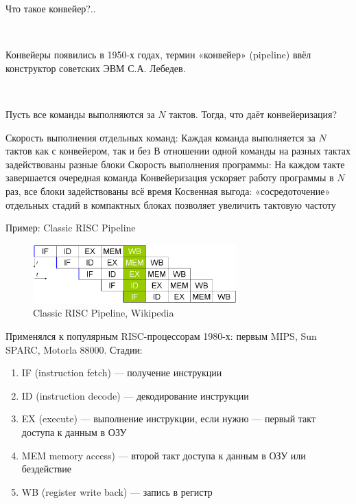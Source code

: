 \documentclass[xetex,aspectratio=43]{beamer}
\begin{document}
\begin{frame}{Что такое конвейер?..}

    ~

    Конвейеры появились в 1950-х годах, термин «конвейер» (pipeline) ввёл конструктор советских ЭВМ С.А. Лебедев.

    ~

    Пусть все команды выполняются за $N$ тактов. Тогда, что даёт конвейеризация?

    \begin{outline}[itemize]
        \1 Скорость выполнения отдельных команд:
            \2 Каждая команда выполняется за $N$ тактов как с конвейером, так и без
            \2 В отношении одной команды на разных тактах задействованы разные блоки
        \1 Скорость выполнения программы:
            \2 На каждом такте завершается очередная команда
            \2 Конвейеризация ускоряет работу программы в $N$ раз, все блоки задействованы всё время
            \pause
            \2 Косвенная выгода: «сосредоточение» отдельных стадий в компактных блоках позволяет увеличить тактовую частоту
    \end{outline}

\end{frame}


\begin{frame}{Пример: Classic RISC Pipeline}
    \begin{figure}
        \includegraphics[width=0.7\textwidth]{img/11.classic-RISC-pipeline.png}
        \caption{Classic RISC Pipeline, Wikipedia}
    \end{figure}
    Применялся к популярным RISC-процессорам 1980-х: первым MIPS, Sun SPARC, Motorla 88000.
    Стадии:
    \begin{enumerate}
        \tightlist
        \item IF (instruction fetch) — получение инструкции
        \item ID (instruction decode) — декодирование инструкции
        \item EX (execute) — выполнение инструкции, если нужно — первый такт доступа к данным в ОЗУ
        \item MEM memory access) — второй такт доступа к данным в ОЗУ или бездействие
        \item WB (register write back) — запись в регистр
    \end{enumerate}
\end{frame}
\end{document}

